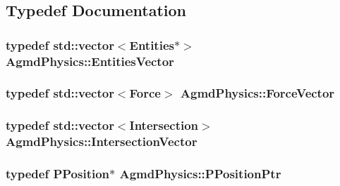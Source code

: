 \subsection{Typedef Documentation}
\hypertarget{namespace_agmd_physics_ab6fd06a64e764c2dc23298f0a0351c23}{
\subsubsection[{Entities\+Vector}]{\setlength{\rightskip}{0pt plus 5cm}typedef std\+::vector$<${\bf Entities}$\ast$$>$ {\bf Agmd\+Physics\+::\+Entities\+Vector}}}\label{namespace_agmd_physics_ab6fd06a64e764c2dc23298f0a0351c23}
\hypertarget{namespace_agmd_physics_a039d4770849466fe53494a7db5bdc3dc}{
\subsubsection[{Force\+Vector}]{\setlength{\rightskip}{0pt plus 5cm}typedef std\+::vector$<${\bf Force}$>$ {\bf Agmd\+Physics\+::\+Force\+Vector}}}\label{namespace_agmd_physics_a039d4770849466fe53494a7db5bdc3dc}
\hypertarget{namespace_agmd_physics_a5b1b4486f555597ab749510899005f8e}{
\subsubsection[{Intersection\+Vector}]{\setlength{\rightskip}{0pt plus 5cm}typedef std\+::vector$<${\bf Intersection}$>$ {\bf Agmd\+Physics\+::\+Intersection\+Vector}}}\label{namespace_agmd_physics_a5b1b4486f555597ab749510899005f8e}
\hypertarget{namespace_agmd_physics_a72f849383bbb96be02fec5a53333d7fd}{
\subsubsection[{P\+Position\+Ptr}]{\setlength{\rightskip}{0pt plus 5cm}typedef {\bf P\+Position}$\ast$ {\bf Agmd\+Physics\+::\+P\+Position\+Ptr}}}\label{namespace_agmd_physics_a72f849383bbb96be02fec5a53333d7fd}


